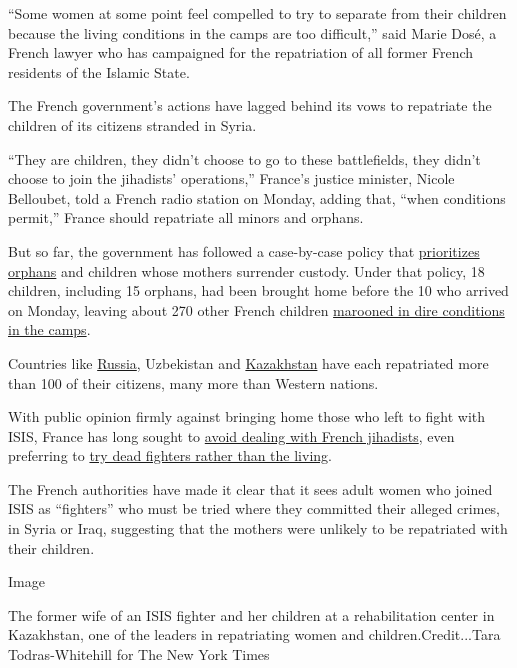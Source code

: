``Some women at some point feel compelled to try to separate from their
children because the living conditions in the camps are too difficult,''
said Marie Dosé, a French lawyer who has campaigned for the repatriation
of all former French residents of the Islamic State.

The French government's actions have lagged behind its vows to
repatriate the children of its citizens stranded in Syria.

``They are children, they didn't choose to go to these battlefields,
they didn't choose to join the jihadists' operations,'' France's justice
minister, Nicole Belloubet, told a French radio station on Monday,
adding that, ``when conditions permit,'' France should repatriate all
minors and orphans.

But so far, the government has followed a case-by-case policy that
\href{https://www.nytimes.com/2019/03/15/world/europe/france-isis-repatriates-children.html}{prioritizes
orphans} and children whose mothers surrender custody. Under that
policy, 18 children, including 15 orphans, had been brought home before
the 10 who arrived on Monday, leaving about 270 other French children
\href{https://www.nytimes.com/2019/05/08/world/middleeast/isis-prisoners-children-women.html}{marooned
in dire conditions in the camps}.

Countries like
\href{https://www.nytimes.com/2018/02/24/world/europe/chechnya-russia-isis-children-return.html}{Russia},
Uzbekistan and
\href{https://www.nytimes.com/2019/08/10/world/europe/kazakhstan-women-islamic-state-deradicalization.html}{Kazakhstan}
have each repatriated more than 100 of their citizens, many more than
Western nations.

With public opinion firmly against bringing home those who left to fight
with ISIS, France has long sought to
\href{https://www.nytimes.com/2019/11/17/world/europe/turkey-isis-fighters-europe.html}{avoid
dealing with French jihadists}, even preferring to
\href{https://www.nytimes.com/2020/01/26/world/europe/france-ghost-trials-isis.html}{try
dead fighters rather than the living}.

The French authorities have made it clear that it sees adult women who
joined ISIS as ``fighters'' who must be tried where they committed their
alleged crimes, in Syria or Iraq, suggesting that the mothers were
unlikely to be repatriated with their children.

Image

The former wife of an ISIS fighter and her children at a rehabilitation
center in Kazakhstan, one of the leaders in repatriating women and
children.Credit...Tara Todras-Whitehill for The New York Times

